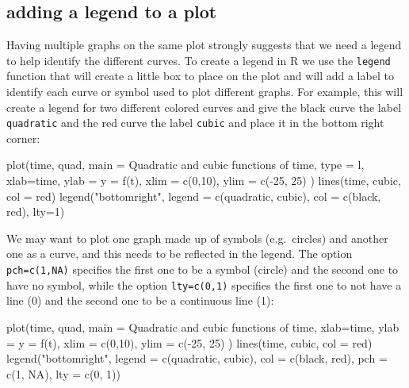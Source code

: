 \documentclass[
  letterpaper,
  DIV=11,
  numbers=noendperiod]{scrreprt}
\newenvironment{Shaded}{\begin{snugshade}}{\end{snugshade}}
\newcommand{\NormalTok}[1]{\textcolor[rgb]{0.00,0.23,0.31}{#1}}
\begin{document}
\hypertarget{adding-a-legend-to-a-plot}{%
\subsection*{adding a legend to a
plot}\label{adding-a-legend-to-a-plot}}

Having multiple graphs on the same plot strongly suggests that we need a
legend to help identify the different curves. To create a legend in R we
use the \texttt{legend} function that will create a little box to place
on the plot and will add a label to identify each curve or symbol used
to plot different graphs. For example, this will create a legend for two
different colored curves and give the black curve the label
\texttt{quadratic} and the red curve the label \texttt{cubic} and place
it in the bottom right corner:

\begin{Shaded}
\begin{Highlighting}[]
\NormalTok{plot(time, quad, main = \textquotesingle{}Quadratic and cubic functions of time\textquotesingle{}, type = \textquotesingle{}l\textquotesingle{}, xlab=\textquotesingle{}time\textquotesingle{}, ylab = \textquotesingle{}y = f(t)\textquotesingle{}, xlim = c(0,10), ylim = c({-}25, 25) )}
\NormalTok{lines(time, cubic, col = \textquotesingle{}red\textquotesingle{})}
\NormalTok{legend("bottomright", legend = c(\textquotesingle{}quadratic\textquotesingle{}, \textquotesingle{}cubic\textquotesingle{}), col = c(\textquotesingle{}black\textquotesingle{}, \textquotesingle{}red\textquotesingle{}), lty=1)}
\end{Highlighting}
\end{Shaded}

We may want to plot one graph made up of symbols (e.g.~circles) and
another one as a curve, and this needs to be reflected in the legend.
The option \texttt{pch=c(1,NA)} specifies the first one to be a symbol
(circle) and the second one to have no symbol, while the option
\texttt{lty=c(0,1)} specifies the first one to not have a line (0) and
the second one to be a continuous line (1):

\begin{Shaded}
\begin{Highlighting}[]
\NormalTok{plot(time, quad, main = \textquotesingle{}Quadratic and cubic functions of time\textquotesingle{}, xlab=\textquotesingle{}time\textquotesingle{}, ylab = \textquotesingle{}y = f(t)\textquotesingle{}, xlim = c(0,10), ylim = c({-}25, 25) )}
\NormalTok{lines(time, cubic, col = \textquotesingle{}red\textquotesingle{})}
\NormalTok{legend("bottomright", legend = c(\textquotesingle{}quadratic\textquotesingle{}, \textquotesingle{}cubic\textquotesingle{}), col = c(\textquotesingle{}black\textquotesingle{}, \textquotesingle{}red\textquotesingle{}), pch = c(1, NA), lty = c(0, 1))}
\end{Highlighting}
\end{Shaded}
\end{document}

